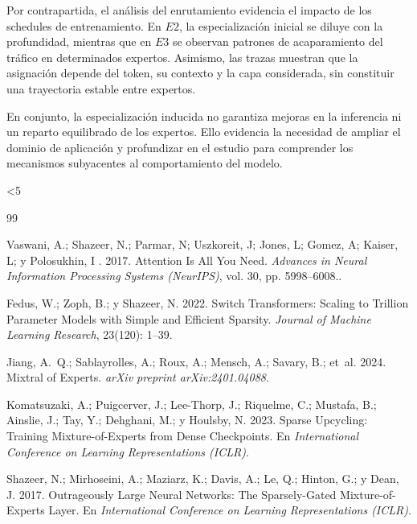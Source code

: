 \documentclass[10pt,twocolumn,a4paper]{article}
\begin{document}
Por contrapartida, el análisis del enrutamiento evidencia el impacto de los schedules de entrenamiento. En $E2$, la especialización inicial se diluye con la profundidad, mientras que en $E3$ se observan patrones de acaparamiento del tráfico en determinados expertos. Asimismo, las trazas muestran que la asignación depende del token, su contexto y la capa considerada, sin constituir una trayectoria estable entre expertos.

En conjunto, la especialización inducida no garantiza mejoras en la inferencia ni un reparto equilibrado de los expertos. Ello evidencia la necesidad de ampliar el dominio de aplicación y profundizar en el estudio para comprender los mecanismos subyacentes al comportamiento del modelo.




\clearpage
\makeatletter
\@whilenum\value{page}<5\do{\null\clearpage}
\makeatother
\renewcommand{\refname}{Referencias}
\renewcommand{\bibfont}{\small}
\setlength{\bibsep}{3pt plus 1pt}
\begin{thebibliography}{99}


Vaswani, A.; Shazeer, N.; Parmar, N; Uszkoreit, J; Jones, L; Gomez, A; Kaiser, L; y Polosukhin, I  . 2017.
\newblock Attention Is All You Need.
\newblock \emph{Advances in Neural Information Processing Systems (NeurIPS)}, vol. 30, pp. 5998--6008..


Fedus, W.; Zoph, B.; y Shazeer, N. 2022.
\newblock Switch Transformers: Scaling to Trillion Parameter Models with Simple and Efficient Sparsity.
\newblock \emph{Journal of Machine Learning Research}, 23(120): 1--39.

Jiang, A.~Q.; Sablayrolles, A.; Roux, A.; Mensch, A.; Savary, B.; et~al. 2024.
\newblock Mixtral of Experts.
\newblock \emph{arXiv preprint arXiv:2401.04088}.

Komatsuzaki, A.; Puigcerver, J.; Lee-Thorp, J.; Riquelme, C.; Mustafa, B.; Ainslie, J.; Tay, Y.; Dehghani, M.; y Houlsby, N. 2023.
\newblock Sparse Upcycling: Training Mixture-of-Experts from Dense Checkpoints.
\newblock En \emph{International Conference on Learning Representations (ICLR)}.

Shazeer, N.; Mirhoseini, A.; Maziarz, K.; Davis, A.; Le, Q.; Hinton, G.; y Dean, J. 2017.
\newblock Outrageously Large Neural Networks: The Sparsely-Gated Mixture-of-Experts Layer.
\newblock En \emph{International Conference on Learning Representations (ICLR)}.

\end{thebibliography}
\end{document}
